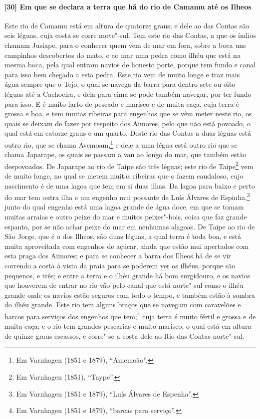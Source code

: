 \begin{linenumbers}
\paragraph{[30] Em que se declara a terra que há do rio de Camamu até os Ilheos} \quad
Este rio de Camamu está em altura de quatorze graus; e dele ao das Contas são seis léguas,
cuja costa se corre norte"-sul. Tem este rio das Contas, a que os índios chamam Jusiape,
para o conhecer quem vem de mar em fora, sobre a boca uns campinhos descobertos do mato, e
ao mar uma pedra como ilhéu que está na mesma boca, pela qual entram navios de honesto
porte, porque tem fundo e canal para isso bem chegado a esta pedra. Este rio vem de muito
longe e traz mais água sempre que o Tejo, o qual se navega da barra para dentro sete ou
oito léguas até a Cachoeira, e dela para cima se pode também navegar, por ter fundo para
isso. E é muito farto de pescado e marisco e de muita caça, cuja terra é grossa e boa, e
tem muitas ribeiras para engenhos que se vêm meter neste rio, os quais se deixam de fazer
por respeito dos Aimores, pelo que não está povoado, o qual está em catorze graus e um
quarto. Deste rio das Contas a duas léguas está outro rio, que se chama Avemoam,\footnote{
Em Varnhagen (1851 e 1879), ``Amemoão''.} e dele a uma légua está outro rio que se chama
Japarape, os quais se passam a vau ao longo do mar, que também estão despovoados. De
Japarape ao rio de Taipe são três léguas; este rio de Taipe\footnote{ Em Varnhagen (1851),
``Taype''.} vem de muito longe, no qual se metem muitas ribeiras que o fazem caudaloso,
cujo nascimento é de uma lagoa que tem em si duas ilhas. Da lagoa para baixo e perto do
mar tem outra ilha e um engenho mui possante de Luís Álvares de Espinha,\footnote{ Em
Varnhagen (1851 e 1879), ``Luís Álvares de Espenha''.} junto do qual engenho está uma
lagoa grande de água doce, em que se tomam muitas arraias e outro peixe do mar e muitos
peixes"-bois, coisa que faz grande espanto, por se não achar peixe do mar em nenhumas
alagoas. De Taipe ao rio de São Jorge, que é o dos Ilheos, são duas léguas, a qual terra é
toda boa, e está muita aproveitada com engenhos de açúcar, ainda que estão mui apertados
com esta praga dos Aimores; e para se conhecer a barra dos Ilheos há de se vir correndo a
costa à vista da praia para se poderem ver os ilhéus, porque são pequenos, e três; e entre
a terra e o ilhéu grande há bom surgidouro, e os navios que houverem de entrar no rio vão
pelo canal que está norte"-sul como o ilhéu grande onde os navios estão seguros com todo o
tempo, e também estão à sombra do ilhéu grande. Este rio tem alguns braços que se navegam
com caravelões e barcos para serviços dos engenhos que tem;\footnote{ Em Varnhagen (1851 e
1879), ``barcas para serviço''.} cuja terra é muito fértil e grossa e de muita caça; e o
rio tem grandes pescarias e muito marisco, o qual está em altura de quinze graus escassos,
e corre"-se a costa dele ao Rio das Contas norte"-sul.


\end{linenumbers}
